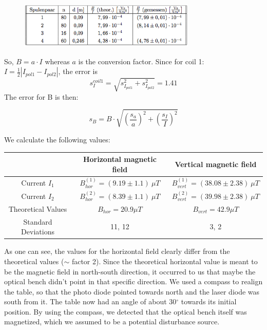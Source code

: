 \begin{figure}[H]
\centering \includegraphics[width=0.75\textwidth]{BilderAusw/Spulenumr.png}
\end{figure}

So, $B=a\cdot I$ whereas $a$ is the conversion factor. Since for coil 1: \ $I=\frac{1}{2}|I_{pol1}-I_{pol2}|$, the error is $$s_I^{coil1} = \sqrt{s_{I_{pol1}}^2 + s_{I_{pol2}}^2} = 1.41$$
The error for B is then:

$$s_B = B\cdot\sqrt{\left(\frac{s_a}{a}\right)^2 + \left(\frac{s_I}{I}\right)^2}$$

We calculate the following values:

\begin{center}
\begin{tabular}[H]{c | c c}
 & Horizontal magnetic field & Vertical magnetic field \\ \hline
Current $I_1$ & $B_{hor}^{(1)} = (9.19 \pm 1.1)\ \mu T$ & $B_{vert}^{(1)} = (38.08 \pm 2.38)\ \mu T$\\
Current $I_2$& $B_{hor}^{(2)} = (8.39 \pm 1.1)\ \mu T$ & $B_{vert}^{(2)} = (39.98 \pm 2.38)\ \mu T$\\
Theoretical Values & $B_{hor} = 20.9 \mu T$ & $B_{vert} = 42.9 \mu T$\\
Standard Deviations & 11, 12 & 3, 2\\
\end{tabular}
\end{center}

As one can see, the values for the horizontal field clearly differ from the theoretical values ($\sim$ factor 2). Since the theoretical horizontal value is meant to be the magnetic field in north-south direction, it occurred to us that maybe the optical bench didn't point in that specific direction. We used a compass to realign the table, so that the photo diode pointed towards north and the laser diode was south from it. The table now had an angle of about 30$^\circ$ towards its initial position. By using the compass, we detected that the optical bench itself was magnetized, which we assumed to be a potential disturbance source.

